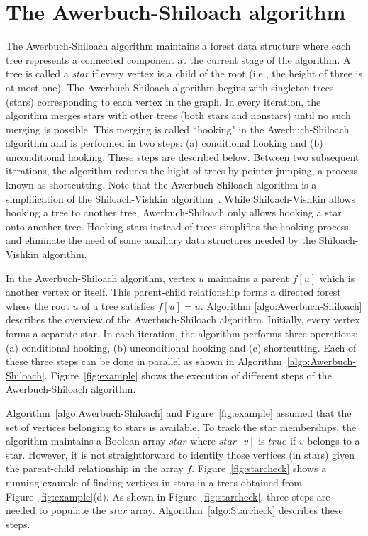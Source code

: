 \section{The Awerbuch-Shiloach algorithm}
The Awerbuch-Shiloach algorithm maintains a forest data structure where each tree represents a connected component at the current stage of the algorithm.
A tree is called a \emph{star} if every vertex is a child of the root (i.e., the height of three is at most one).
The Awerbuch-Shiloach algorithm begins with singleton trees (stars) corresponding to each vertex in the graph.
In every iteration, the algorithm merges stars with other trees (both stars and nonstars) until no such merging is possible. 
This merging is called ``hooking" in the Awerbuch-Shiloach algorithm and is performed in two steps: (a) conditional hooking and (b) unconditional hooking. These steps are described below.
Between two subsequent iterations, the algorithm reduces the hight of trees by pointer jumping, a process known as shortcutting. 
Note that the Awerbuch-Shiloach algorithm is a simplification of the Shiloach-Vishkin algorithm~\cite{shiloach1980log}. While Shiloach-Vishkin allows hooking a tree to another tree, Awerbuch-Shiloach only allows hooking a star onto another tree. Hooking stars instead of trees simplifies the hooking process and eliminate the need of some auxiliary data structures needed by the Shiloach-Vishkin algorithm.

In the Awerbuch-Shiloach algorithm, vertex $u$ maintains a parent $f[u]$ which is another vertex or itself. 
This parent-child relationship forms a directed forest where the root $u$ of a tree satisfies $f[u]=u$.
Algorithm \ref{algo:Awerbuch-Shiloach} describes the overview of the Awerbuch-Shiloach algorithm.
Initially, every vertex forms a separate star. 
In each iteration, the algorithm performs three operations: (a) conditional hooking, (b) unconditional hooking and (c) shortcutting.
Each of these three steps can be done in parallel as shown in Algorithm~\ref{algo:Awerbuch-Shiloach}.
Figure~\ref{fig:example} shows the execution of different steps of the Awerbuch-Shiloach algorithm.

Algorithm~\ref{algo:Awerbuch-Shiloach} and Figure~\ref{fig:example} assumed that the set of vertices belonging to stars is available.  
To track the star memberships, the algorithm maintains a Boolean array $star$ where $star[v]$ is $true$ if $v$ belongs to a star.
However, it is not straightforward to identify those vertices (in stars) given the parent-child relationship in the array $f$.
Figure~\ref{fig:starcheck} shows a running example of finding vertices in stars in a trees obtained from Figure~\ref{fig:example}(d).
As shown in Figure~\ref{fig:starcheck}, three steps are needed to populate the $star$ array. 
Algorithm~\ref{algo:Starcheck} describes these steps.


